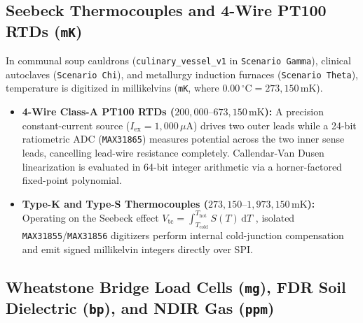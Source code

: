 \subsection{Seebeck Thermocouples and 4-Wire PT100 RTDs (\texttt{mK})}

In communal soup cauldrons (\texttt{culinary\_vessel\_v1} in \texttt{Scenario Gamma}), clinical autoclaves (\texttt{Scenario Chi}), and metallurgy induction furnaces (\texttt{Scenario Theta}), temperature is digitized in millikelvins (\texttt{mK}, where $0.00\,^\circ\mathrm{C} = 273{,}150\,\mathrm{mK}$).
\begin{itemize}
    \item \textbf{4-Wire Class-A PT100 RTDs ($200{,}000\text{--}673{,}150\,\mathrm{mK}$):} A precision constant-current source ($I_{\mathrm{ex}} = 1{,}000\,\mu\mathrm{A}$) drives two outer leads while a 24-bit ratiometric ADC (\texttt{MAX31865}) measures potential across the two inner sense leads, cancelling lead-wire resistance completely. Callendar-Van Dusen linearization is evaluated in 64-bit integer arithmetic via a horner-factored fixed-point polynomial.
    \item \textbf{Type-K and Type-S Thermocouples ($273{,}150\text{--}1{,}973{,}150\,\mathrm{mK}$):} Operating on the Seebeck effect $V_{\mathrm{tc}} = \int_{T_{\mathrm{cold}}}^{T_{\mathrm{hot}}} S(T)\,\mathrm{d}T$ \parencite{rowe1995crc}, isolated \texttt{MAX31855}/\texttt{MAX31856} digitizers perform internal cold-junction compensation and emit signed millikelvin integers directly over SPI.
\end{itemize}

\subsection{Wheatstone Bridge Load Cells (\texttt{mg}), FDR Soil Dielectric (\texttt{bp}), and NDIR Gas (\texttt{ppm})}

